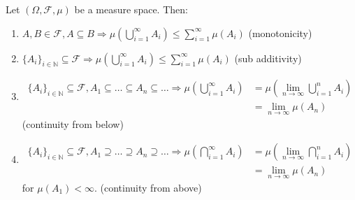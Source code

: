 \documentclass{article}
\begin{document}
	\begin{myprop}{}{}
		Let $(\Omega, \mathcal{F}, \mu)$ be a measure space. Then:
		\begin{enumerate}
			\item $A, B\in\mathcal{F}, A\subseteq B\Rightarrow\mu(\bigcup_{i=1}^{\infty}A_i)\leq\sum_{i=1}^{\infty}\mu(A_i)$ (monotonicity)
			\item $\{A_i\}_{i\in\mathbb{N}}\subseteq\mathcal{F}\Rightarrow\mu(\bigcup_{i=1}^{\infty}A_i)\leq\sum_{i=1}^{\infty}\mu(A_i)$ (sub additivity)
			\item \begin{align*}
				\{A_i\}_{i\in\mathbb{N}}\subseteq\mathcal{F}, A_1\subseteq\dots\subseteq A_n\subseteq\dots\Rightarrow\mu(\bigcup_{i=1}^{\infty}A_i)&=\mu(\lim_{n\to\infty}\bigcup_{i=1}^{n}A_i)\\
				&=\lim_{n\to\infty}\mu(A_n)
			\end{align*}
			(continuity from below)
			\item \begin{align*}
				\{A_i\}_{i\in\mathbb{N}}\subseteq\mathcal{F}, A_1\supseteq\dots\supseteq A_n\supseteq\dots\Rightarrow\mu(\bigcap_{i=1}^{\infty}A_i)&=\mu(\lim_{n\to\infty}\bigcap_{i=1}^{n}A_i)\\
				&=\lim_{n\to\infty}\mu(A_n)
			\end{align*} for $\mu(A_1)<\infty$.
			(continuity from above)
		\end{enumerate}
		

\end{myprop}
\end{document}

